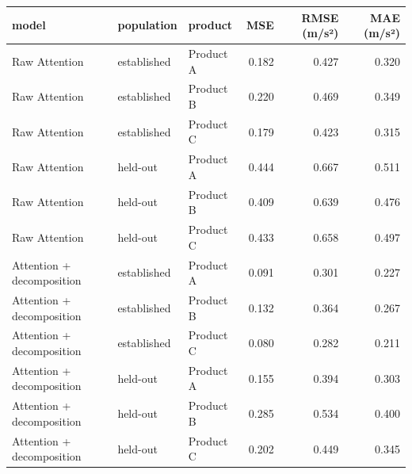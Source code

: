\begin{tabular}{lllrrr}
\toprule
model & population & product & MSE & RMSE (m/s²) & MAE (m/s²) \\
\midrule
Raw Attention & established & Product A & 0.182 & 0.427 & 0.320 \\
Raw Attention & established & Product B & 0.220 & 0.469 & 0.349 \\
Raw Attention & established & Product C & 0.179 & 0.423 & 0.315 \\
Raw Attention & held-out & Product A & 0.444 & 0.667 & 0.511 \\
Raw Attention & held-out & Product B & 0.409 & 0.639 & 0.476 \\
Raw Attention & held-out & Product C & 0.433 & 0.658 & 0.497 \\
Attention + decomposition & established & Product A & 0.091 & 0.301 & 0.227 \\
Attention + decomposition & established & Product B & 0.132 & 0.364 & 0.267 \\
Attention + decomposition & established & Product C & 0.080 & 0.282 & 0.211 \\
Attention + decomposition & held-out & Product A & 0.155 & 0.394 & 0.303 \\
Attention + decomposition & held-out & Product B & 0.285 & 0.534 & 0.400 \\
Attention + decomposition & held-out & Product C & 0.202 & 0.449 & 0.345 \\
\bottomrule
\end{tabular}
